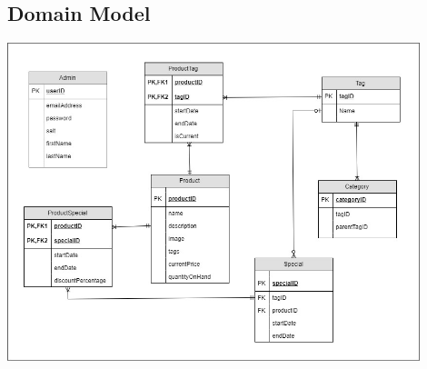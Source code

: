 \documentclass[a4paper,10pt]{article}
\begin{document}
\subsection{Domain Model}
\includegraphics[width=12cm]{Domain_Model.jpg}
\end{document}
